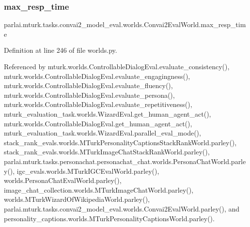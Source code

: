\subsubsection{\texorpdfstring{max\+\_\+resp\+\_\+time}{max\_resp\_time}}
{\footnotesize\ttfamily parlai.\+mturk.\+tasks.\+convai2\+\_\+model\+\_\+eval.\+worlds.\+Convai2\+Eval\+World.\+max\+\_\+resp\+\_\+time}



Definition at line 246 of file worlds.\+py.



Referenced by mturk.\+worlds.\+Controllable\+Dialog\+Eval.\+evaluate\+\_\+consistency(), mturk.\+worlds.\+Controllable\+Dialog\+Eval.\+evaluate\+\_\+engagingness(), mturk.\+worlds.\+Controllable\+Dialog\+Eval.\+evaluate\+\_\+fluency(), mturk.\+worlds.\+Controllable\+Dialog\+Eval.\+evaluate\+\_\+persona(), mturk.\+worlds.\+Controllable\+Dialog\+Eval.\+evaluate\+\_\+repetitiveness(), mturk\+\_\+evaluation\+\_\+task.\+worlds.\+Wizard\+Eval.\+get\+\_\+human\+\_\+agent\+\_\+act(), mturk.\+worlds.\+Controllable\+Dialog\+Eval.\+get\+\_\+human\+\_\+agent\+\_\+act(), mturk\+\_\+evaluation\+\_\+task.\+worlds.\+Wizard\+Eval.\+parallel\+\_\+eval\+\_\+mode(), stack\+\_\+rank\+\_\+evals.\+worlds.\+M\+Turk\+Personality\+Captions\+Stack\+Rank\+World.\+parley(), stack\+\_\+rank\+\_\+evals.\+worlds.\+M\+Turk\+Image\+Chat\+Stack\+Rank\+World.\+parley(), parlai.\+mturk.\+tasks.\+personachat.\+personachat\+\_\+chat.\+worlds.\+Persona\+Chat\+World.\+parley(), igc\+\_\+evals.\+worlds.\+M\+Turk\+I\+G\+C\+Eval\+World.\+parley(), worlds.\+Persona\+Chat\+Eval\+World.\+parley(), image\+\_\+chat\+\_\+collection.\+worlds.\+M\+Turk\+Image\+Chat\+World.\+parley(), worlds.\+M\+Turk\+Wizard\+Of\+Wikipedia\+World.\+parley(), parlai.\+mturk.\+tasks.\+convai2\+\_\+model\+\_\+eval.\+worlds.\+Convai2\+Eval\+World.\+parley(), and personality\+\_\+captions.\+worlds.\+M\+Turk\+Personality\+Captions\+World.\+parley().

\mbox{\label{classparlai_1_1mturk_1_1tasks_1_1convai2__model__eval_1_1worlds_1_1Convai2EvalWorld_ae7db2e165123013a4e83dec5c03b65c4}} 
